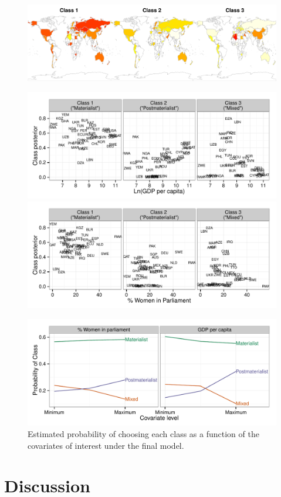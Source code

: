 \documentclass[letterpaper,12pt]{article}
\begin{document}
\begin{figure}
	\includegraphics[width=\textwidth]{figures/maps.pdf}
	
	\caption{\label{fig:maps}}
\end{figure}

\begin{figure}
	\includegraphics[width=\textwidth]{figures/gdp-posterior.pdf}
	
	\includegraphics[width=\textwidth]{figures/women-posterior.pdf}

	\caption{\label{fig:posterior}}
\end{figure}

\begin{figure}
	\includegraphics[width=\textwidth]{figures/covariates.pdf}
	\caption{\label{fig:covariates}Estimated probability of choosing each class as a function of the covariates of interest under the final model.}
\end{figure}


\section{Discussion}





\end{document}
